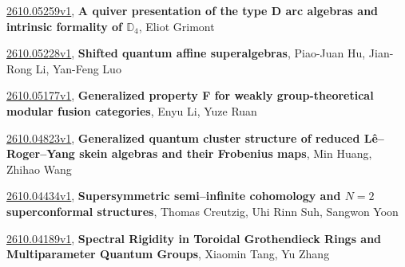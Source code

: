 \documentclass[9pt, a4paper]{article}
\theoremstyle{plain}
\theoremstyle{definition}
\theoremstyle{remark}
\newcommand{\arxiv}[3]{\href{https://arxiv.org/abs/#1}{#1}, \textbf{\textcolor{arxivblue}{#2}}, #3}
\begin{document}
\arxiv{2610.05259v1}{A quiver presentation of the type D arc algebras and intrinsic formality of $\mathbb{D}_4$}{Eliot Grimont}

\arxiv{2610.05228v1}{Shifted quantum affine superalgebras}{Piao-Juan Hu, Jian-Rong Li, Yan-Feng Luo}

\arxiv{2610.05177v1}{Generalized property F for weakly group-theoretical modular fusion categories}{Enyu Li, Yuze Ruan}

\arxiv{2610.04823v1}{Generalized quantum cluster structure of reduced Lê--Roger--Yang skein algebras and their Frobenius maps}{Min Huang, Zhihao Wang}

\arxiv{2610.04434v1}{Supersymmetric semi--infinite cohomology and $N = 2$ superconformal structures}{Thomas Creutzig, Uhi Rinn Suh, Sangwon Yoon}

\arxiv{2610.04189v1}{Spectral Rigidity in Toroidal Grothendieck Rings and Multiparameter Quantum Groups}{Xiaomin Tang, Yu Zhang}

\end{document}
